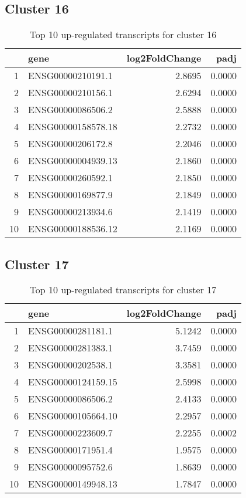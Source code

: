 \documentclass{article}
\begin{document}
\subsection{Cluster 16 }
\begin{table}[H]
\centering
\begin{tabularx}{\textwidth}{rlrr}
  \hline
 & gene & log2FoldChange & padj \\ 
  \hline
1 & ENSG00000210191.1 & 2.8695 & 0.0000 \\ 
  2 & ENSG00000210156.1 & 2.6294 & 0.0000 \\ 
  3 & ENSG00000086506.2 & 2.5888 & 0.0000 \\ 
  4 & ENSG00000158578.18 & 2.2732 & 0.0000 \\ 
  5 & ENSG00000206172.8 & 2.2046 & 0.0000 \\ 
  6 & ENSG00000004939.13 & 2.1860 & 0.0000 \\ 
  7 & ENSG00000260592.1 & 2.1850 & 0.0000 \\ 
  8 & ENSG00000169877.9 & 2.1849 & 0.0000 \\ 
  9 & ENSG00000213934.6 & 2.1419 & 0.0000 \\ 
  10 & ENSG00000188536.12 & 2.1169 & 0.0000 \\ 
   \hline
\end{tabularx}
\caption{Top 10 up-regulated transcripts for cluster 16} 
\label{tab:q3_1_16}
\end{table}
\subsection{Cluster 17 }
\begin{table}[H]
\centering
\begin{tabularx}{\textwidth}{rlrr}
  \hline
 & gene & log2FoldChange & padj \\ 
  \hline
1 & ENSG00000281181.1 & 5.1242 & 0.0000 \\ 
  2 & ENSG00000281383.1 & 3.7459 & 0.0000 \\ 
  3 & ENSG00000202538.1 & 3.3581 & 0.0000 \\ 
  4 & ENSG00000124159.15 & 2.5998 & 0.0000 \\ 
  5 & ENSG00000086506.2 & 2.4133 & 0.0000 \\ 
  6 & ENSG00000105664.10 & 2.2957 & 0.0000 \\ 
  7 & ENSG00000223609.7 & 2.2255 & 0.0002 \\ 
  8 & ENSG00000171951.4 & 1.9575 & 0.0000 \\ 
  9 & ENSG00000095752.6 & 1.8639 & 0.0000 \\ 
  10 & ENSG00000149948.13 & 1.7847 & 0.0000 \\ 
   \hline
\end{tabularx}
\caption{Top 10 up-regulated transcripts for cluster 17} 
\label{tab:q3_1_17}
\end{table}
\end{document}
